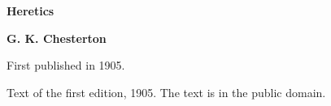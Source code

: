 \documentclass[11pt,letterpaper]{article}
\begin{document}
\color{ink}

\begin{titlepage}
\centering
\vspace*{4em}
{\LARGE\bfseries\color{heading} Heretics\par}
\vspace{2em}
{\Large\bfseries\color{heading} G. K. Chesterton\par}
\vspace{2.5em}
{\itshape\color{subhead}\parbox{0.8\linewidth}{\centering First published in 1905.\par}}
\vfill
{\small Text of the first edition, 1905. The text is in the public domain.\par}
\vspace{2em}
\end{titlepage}

\tableofcontents


\end{document}
